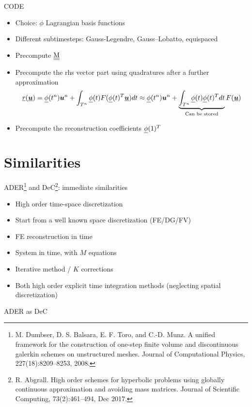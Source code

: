 \documentclass[9pt,compress,t,aspectratio=169]{beamer}
\begin{document}
\begin{frame}{CODE}
	\begin{itemize}
		\item Choice: $\phi$ Lagrangian basis functions
		\item Different subtimesteps: Gauss-Legendre, Gauss--Lobatto, equispaced
		\item Precompute $\underline{\underline{\mathrm{M}}}$
		\item Precompute the rhs vector part using quadratures after a further approximation 
		$$\underline{r}(\underline{\boldsymbol{u}}) =  \underline{\phi}(t^{n}) \boldsymbol{u}^n + \int_{T^n} \underline{\phi}(t)  F(\underline{\phi}(t)^T\underline{\boldsymbol{u}})  dt \approx \underline{\phi}(t^{n}) \boldsymbol{u}^n + \underbrace{\int_{T^n} \underline{\phi}(t)\underline{\phi}(t)^Tdt}_{\text{Can be stored}}  F(\underline{\boldsymbol{u}})  $$
		\item Precompute the reconstruction coefficients $\underline{\phi}(1)^T$
	\end{itemize}
\end{frame}


\section{Similarities}
\begin{frame}{ADER\footnote{M. Dumbser, D. S. Balsara, E. F. Toro, and C.-D. Munz. A unified framework for the construction of one-step finite volume and discontinuous galerkin schemes on unstructured meshes. Journal of Computational Physics, 227(18):8209–8253, 2008.} and DeC\footnote{R. Abgrall. High order schemes for hyperbolic problems using globally continuous approximation and avoiding mass matrices. Journal of Scientific Computing, 73(2):461–494, Dec 2017.}: immediate similarities}
	\begin{itemize}
		\item High order time-space discretization
		\item Start from a well known space discretization (FE/DG/FV)
		\item FE reconstruction in time
		\item System in time, with $M$ equations 
		\item Iterative method / $K$ corrections  
	\end{itemize}
	\pause
	\begin{itemize}
		\item Both high order explicit time integration methods (neglecting spatial discretization)
	\end{itemize}
	
\end{frame}
\begin{frame}{ADER as DeC}

\end{frame}
\end{document}
